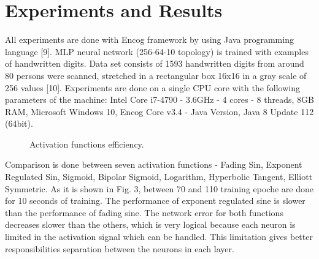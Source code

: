 \documentclass{llncs}
\begin{document}
\section{Experiments and Results}
%
All experiments are done with Encog framework by using Java programming language [9]. MLP neural network  (256-64-10 topology) is trained with examples of handwritten digits. Data set consists of 1593 handwritten digits from around 80 persons were scanned, stretched in a rectangular box 16x16 in a gray scale of 256 values [10]. Experiments are done on a single CPU core with the following parameters of the machine: Intel Core i7-4790 - 3.6GHz - 4 cores - 8 threads, 8GB RAM, Microsoft Windows 10, Encog Core v3.4 - Java Version, Java 8 Update 112 (64bit). 
%
\begin{figure}
    \centering
    \caption{Activation functions efficiency.}
    \label{fig:fig02}
\end{figure}
\FloatBarrier
%
Comparison is done between seven activation functions - Fading Sin, Exponent Regulated Sin, Sigmoid, Bipolar Sigmoid, Logarithm, Hyperbolic Tangent, Elliott Symmetric. As it is shown in Fig. 3, between 70 and 110 training epoche are done for 10 seconds of training. The performance of exponent regulated sine is slower than the performance of fading sine. The network error for both functions decreases slower than the others, which is very logical because each neuron is limited in the activation signal which can be handled. This limitation gives better responsibilities separation between the neurons in each layer. 
%
\end{document}
